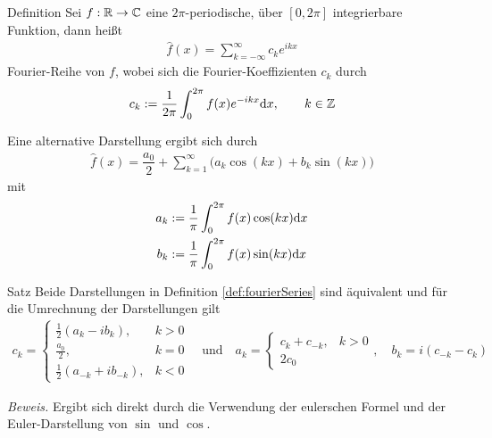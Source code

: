 \begin{colbox}{Definition}\label{def:fourierSeries}
  Sei $f:\mathbb R\to\mathbb C$ eine $2\pi$-periodische, über $[0,2\pi]$ integrierbare Funktion, dann heißt 
  \begin{align*}
    \hat{f}(x) = \sum_{k=-\infty}^{\infty} c_k e^{ikx}
  \end{align*}
  Fourier-Reihe von $f$, wobei sich die Fourier-Koeffizienten $c_k$ durch 
  \begin{align*}
    c_k := \dfrac{1}{2\pi}\int_{0}^{2\pi} f(x)e^{-ikx} \text{d} x, \qquad k\in\mathbb Z
  \end{align*}

  Eine alternative Darstellung ergibt sich durch
  \begin{align*}
    \hat{f}(x) = \dfrac{a_0}{2} + \sum_{k=1}^{\infty} \big(a_k\cos(kx) + b_k\sin(kx)\big)
  \end{align*}
  mit 
  \begin{align*}
    a_k &:= \dfrac{1}{\pi} \int_{0}^{2\pi} f(x)\cos(kx) \text{d} x \\
    b_k &:= \dfrac{1}{\pi} \int_{0}^{2\pi} f(x)\sin(kx) \text{d} x
  \end{align*}
\end{colbox}

\begin{colbox}{Satz}
  Beide Darstellungen in Definition \ref{def:fourierSeries} sind äquivalent und 
  für die Umrechnung der Darstellungen gilt 
  \begin{align*}
    c_k = \begin{cases}
      \tfrac{1}{2}(a_k-ib_k), & k>0 \\
      \tfrac{a_0}{2}, & k=0 \\
      \tfrac{1}{2}(a_{-k}+ib_{-k}), & k<0
    \end{cases}
    \quad \text{und}\quad 
    a_k = \begin{cases}
      c_k + c_{-k}, & k>0 \\
      2c_0
    \end{cases},
    \quad 
    b_k = i(c_{-k} - c_k)
  \end{align*}
\end{colbox}
\textit{Beweis.} Ergibt sich direkt durch die Verwendung der eulerschen Formel und der Euler-Darstellung 
von $\sin$ und $\cos$.

